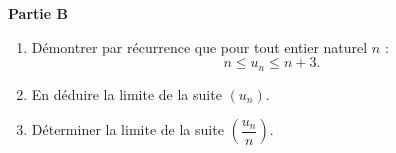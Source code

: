 \documentclass[10pt]{article}
\begin{document}
\bigskip

\textbf{Partie B}

\medskip

\begin{enumerate}
\item Démontrer par récurrence que pour tout entier naturel $n$ :
\[n \leqslant u_n \leqslant n + 3.\]

\item En déduire la limite de la suite $\left(u_n\right)$.
\item Déterminer la limite de la suite $\left(\dfrac{u_n}{n}\right)$.
\end{enumerate}

\bigskip
\end{document}
